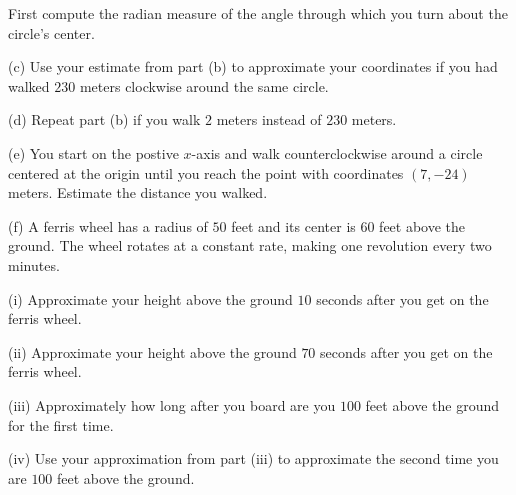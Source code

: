 \documentclass{ximera}
\begin{document}
\begin{question}
\begin{hint}
First compute the radian measure of the angle through which you turn about the circle's center.
\end{hint}

(c) Use your estimate from part (b) to approximate your coordinates if you had walked $230$ meters clockwise around the same circle.

(d) Repeat part (b) if you walk $2$ meters instead of $230$ meters.

(e) You start on the postive $x$-axis and walk counterclockwise around a circle centered at the origin until you reach the point with coordinates $(7,-24)$ meters. Estimate the distance you walked.  



(f) A ferris wheel has a radius of $50$ feet and its center is $60$ feet above the ground. The wheel rotates at a constant rate, making one revolution every two minutes.

(i) Approximate your height above the ground $10$ seconds after you get on the ferris wheel. 

(ii) Approximate your height above the ground $70$ seconds after you get on the ferris wheel. 

(iii) Approximately how long after you board are you $100$ feet above the ground for the first time.

(iv) Use your approximation from part (iii) to approximate the second time you are $100$ feet above the ground.


\begin{exploration}
 
\begin{onlineOnly}
    \begin{center}
\end{center}
\end{onlineOnly}
\end{exploration}

\end{question}
\end{document}
